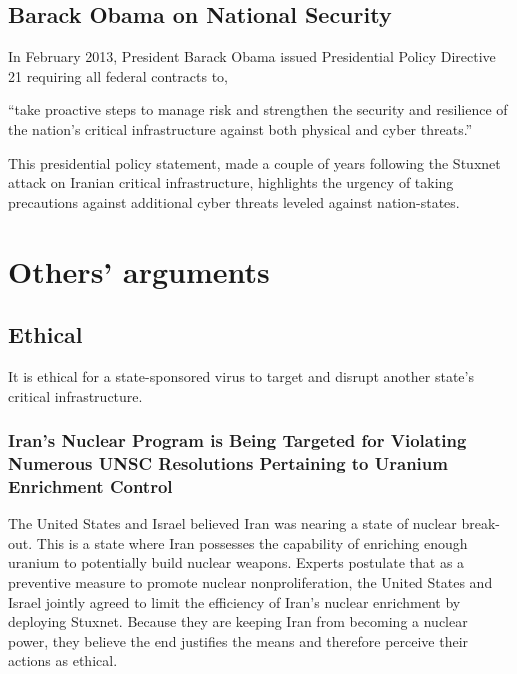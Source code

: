 \documentclass[12pt]{article}
\begin{document}
\begin{multicols}{2}
\subsection{Barack Obama on National Security}

In February 2013, President Barack Obama issued Presidential Policy Directive 21 requiring all federal contracts to,

\begin{displayquote}
``take proactive steps to manage risk and strengthen the security and resilience of the nation's critical infrastructure against both physical and cyber threats.''\cite{industrialCyberVulnerabilities}
\end{displayquote}

This presidential policy statement, made a couple of years following the Stuxnet attack on Iranian critical infrastructure, highlights the urgency of taking precautions against additional cyber threats leveled against nation-states.

\section{Others' arguments}

\subsection{Ethical}

It is ethical for a state-sponsored virus to target and disrupt another state's critical infrastructure.

\subsubsection{Iran's Nuclear Program is Being Targeted for Violating Numerous UNSC Resolutions Pertaining to Uranium Enrichment Control}

The United States and Israel believed Iran was nearing a state of nuclear break-out. This is a state where Iran possesses the capability of enriching enough uranium to potentially build nuclear weapons. Experts postulate that as a preventive measure to promote nuclear nonproliferation, the United States and Israel jointly agreed to limit the efficiency of Iran's nuclear enrichment by deploying Stuxnet.\cite{theRealStoryOfStuxnet}  Because they are keeping Iran from becoming a nuclear power, they believe the end justifies the means and therefore perceive their actions as ethical.


\end{multicols}
\end{document}
